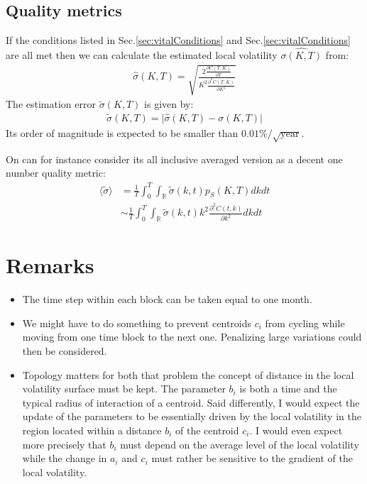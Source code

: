 \documentclass[10pt,a4paper]{article}
\begin{document}
\subsection{Quality metrics}
If the conditions listed in Sec.\ref{sec:vitalConditions} and Sec.\ref{sec:vitalConditions} are all met then we can calculate the estimated local volatility $\hat{\sigma(K,T)}$ from:
\begin{align}
\hat{\sigma} (K,T)= \sqrt{\frac{2\frac{\partial C(T,K)}{\partial T}}{K^2\frac{\partial^2 C(T,K)}{\partial K^2}}}
\end{align}
The estimation error $\tilde{\sigma} (K,T)$ is given by:
\begin{align}
\tilde{\sigma} (K,T) =\vert \hat{\sigma} (K,T) - \sigma(K,T) \vert
\end{align}
Its order of magnitude is expected to be smaller than $0.01\%/\sqrt{\text{year}}$.

On can for instance consider its all inclusive averaged version as a decent one number quality metric:
\begin{align}
\langle\tilde{\sigma}\rangle &= \frac{1}{T} \int_0^T \int_{\mathbb{R}}\tilde{\sigma} (k,t) p_S(K,T) dk dt\\
&\sim \frac{1}{T} \int_0^T \int_{\mathbb{R}}\tilde{\sigma} (k,t)  k^2 \frac{\partial^2 C(t,k)}{\partial k^2}  dk dt
\end{align}
\section{Remarks}
\begin{itemize}
\item The time step within each block can be taken equal to one month.
\item We might have to do something to prevent centroids $c_i$ from cycling while moving from one time block to the next one. Penalizing large variations could then be considered.
\item Topology matters for both that problem the concept of distance in the local volatility surface must be kept. The parameter $b_i$ is both a time and the typical radius of interaction of a centroid. Said differently, I would expect the update of the parameters to be essentially driven by the local volatility in the region located within a distance $b_i$ of the centroid $c_i$. I would even expect more precisely that $b_i$ must depend on the average level of the local volatility while the change in $a_i$ and $c_i$ must rather be sensitive to the gradient of the local volatility.
\end{itemize}
\end{document}
